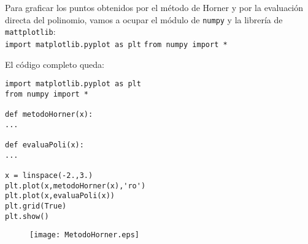 \documentclass[12pt]{beamer}
\begin{document}
\begin{frame}[fragile]
Para graficar los puntos obtenidos por el m\'{e}todo de Horner y por la evaluaci\'{o}n directa del polinomio, vamos a ocupar el m\'{o}dulo de \texttt{numpy} y la librer\'{i}a de \texttt{mattplotlib}:
\\
\medskip
\verb|import matplotlib.pyplot as plt|
\verb|from numpy import *|
\end{frame}
\begin{frame}[fragile]
El c\'{o}digo completo queda:
\begin{lstlisting}
import matplotlib.pyplot as plt
from numpy import *

def metodoHorner(x):
...

def evaluaPoli(x):
...

x = linspace(-2.,3.)
plt.plot(x,metodoHorner(x),'ro')
plt.plot(x,evaluaPoli(x))
plt.grid(True)
plt.show()
\end{lstlisting}
\end{frame}
\begin{frame}[fragile]
\begin{figure}
	\centering
	\texttt{[image: MetodoHorner.eps]} 
\end{figure}
\end{frame}
\end{document}
